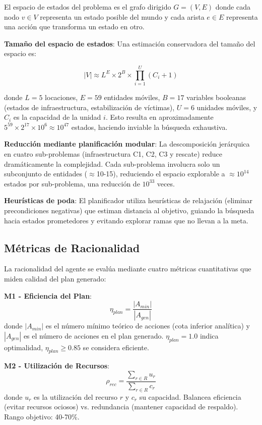 \documentclass[conference]{IEEEtran}
\begin{document}
    El espacio de estados del problema es el grafo dirigido $G = (V, E)$ donde cada nodo $v \in V$ representa un estado posible del mundo y cada arista $e \in E$ representa una acción que transforma un estado en otro.

    \textbf{Tamaño del espacio de estados}: Una estimación conservadora del tamaño del espacio es:

    \[
    |V| \approx L^{E} \times 2^{B} \times \prod_{i=1}^{U} (C_i + 1)
    \]

    donde $L=5$ locaciones, $E=59$ entidades móviles, $B=17$ variables booleanas (estados de infraestructura, estabilización de víctimas), $U=6$ unidades móviles, y $C_i$ es la capacidad de la unidad $i$. Esto resulta en aproximadamente $5^{59} \times 2^{17} \times 10^6 \approx 10^{47}$ estados, haciendo inviable la búsqueda exhaustiva.

    \textbf{Reducción mediante planificación modular}: La descomposición jerárquica en cuatro sub-problemas (infraestructura C1, C2, C3 y rescate) reduce dramáticamente la complejidad. Cada sub-problema involucra solo un subconjunto de entidades ($\approx$10-15), reduciendo el espacio explorable a $\approx 10^{14}$ estados por sub-problema, una reducción de $10^{33}$ veces.

    \textbf{Heurísticas de poda}: El planificador utiliza heurísticas de relajación (eliminar precondiciones negativas) que estiman distancia al objetivo, guiando la búsqueda hacia estados prometedores y evitando explorar ramas que no llevan a la meta.

    \subsection{Métricas de Racionalidad}

    La racionalidad del agente se evalúa mediante cuatro métricas cuantitativas que miden calidad del plan generado:

    \textbf{M1 - Eficiencia del Plan}:
    \[
    \eta_{plan} = \frac{|A_{min}|}{|A_{gen}|}
    \]
    donde $|A_{min}|$ es el número mínimo teórico de acciones (cota inferior analítica) y $|A_{gen}|$ es el número de acciones en el plan generado. $\eta_{plan} = 1.0$ indica optimalidad, $\eta_{plan} \geq 0.85$ se considera eficiente.

    \textbf{M2 - Utilización de Recursos}:
    \[
    \rho_{rec} = \frac{\sum_{r \in R} u_r}{\sum_{r \in R} c_r}
    \]
    donde $u_r$ es la utilización del recurso $r$ y $c_r$ su capacidad. Balancea eficiencia (evitar recursos ociosos) vs. redundancia (mantener capacidad de respaldo). Rango objetivo: 40-70\%.
\end{document}
